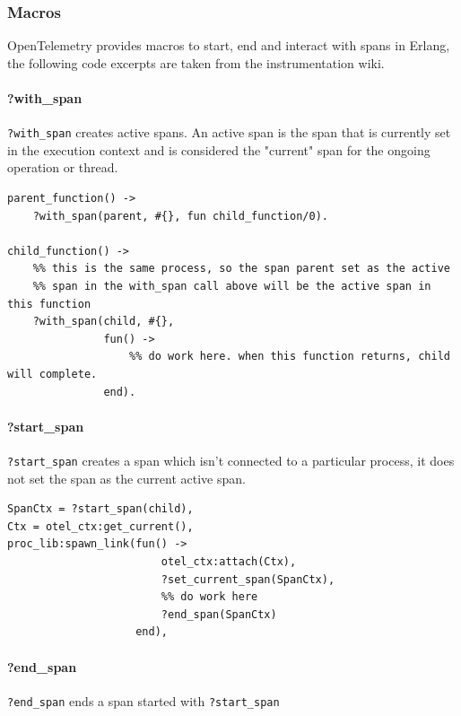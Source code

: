     \subsubsection{Macros}
        OpenTelemetry provides macros to start, end and interact with spans in Erlang, the following code excerpts are taken from the instrumentation wiki. \cite{otel-in}
        \paragraph{?with\_span}
            \texttt{?with\_span} creates active spans. An active span is the span that is currently set in the execution context and is considered the "current" span for the ongoing operation or thread. \cite{active-s}
        \begin{verbatim}
parent_function() ->
    ?with_span(parent, #{}, fun child_function/0).

child_function() ->
    %% this is the same process, so the span parent set as the active
    %% span in the with_span call above will be the active span in this function
    ?with_span(child, #{},
               fun() ->
                   %% do work here. when this function returns, child will complete.
               end).
        \end{verbatim}

        \paragraph{?start\_span}
            \texttt{?start\_span} creates a span which isn't connected to a particular process, it does not set the span as the current active span.
        \begin{verbatim}
SpanCtx = ?start_span(child),
Ctx = otel_ctx:get_current(),
proc_lib:spawn_link(fun() ->
                        otel_ctx:attach(Ctx),
                        ?set_current_span(SpanCtx),
                        %% do work here
                        ?end_span(SpanCtx)
                    end),
        \end{verbatim}

        \paragraph{?end\_span}
            \texttt{?end\_span} ends a span started with \texttt{?start\_span}

